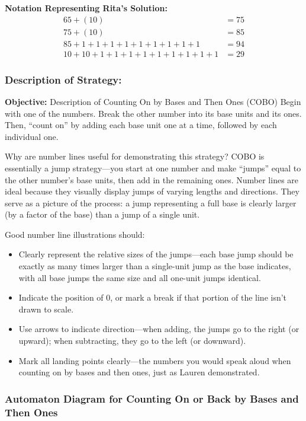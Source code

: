 \documentclass[11pt]{article}
\begin{document}
\noindent \textbf{Notation Representing Rita's Solution:}
\begin{align*}
    65 + (10) &= 75\\
    75 + (10) &= 85\\
    85 + 1 + 1 + 1 + 1 + 1 + 1 + 1 + 1 + 1 &= 94\\
    10 + 10 + 1 + 1 + 1 + 1 + 1 + 1 + 1 + 1 + 1 &= 29
    \end{align*}
    

\subsubsection*{Description of Strategy:}

 \textbf{Objective:} Description of Counting On by Bases and Then Ones (COBO)
 Begin with one of the numbers. Break the other number into its base units and its ones. Then, “count on” by adding each base unit one at a time, followed by each individual one.
 
 Why are number lines useful for demonstrating this strategy?
 COBO is essentially a jump strategy—you start at one number and make “jumps” equal to the other number’s base units, then add in the remaining ones. Number lines are ideal because they visually display jumps of varying lengths and directions. They serve as a picture of the process: a jump representing a full base is clearly larger (by a factor of the base) than a jump of a single unit.
 
 Good number line illustrations should:
\begin{itemize}
 \item Clearly represent the relative sizes of the jumps—each base jump should be exactly as many times larger than a single-unit jump as the base indicates, with all base jumps the same size and all one-unit jumps identical.
 \item Indicate the position of 0, or mark a break if that portion of the line isn’t drawn to scale.
 \item Use arrows to indicate direction—when adding, the jumps go to the right (or upward); when subtracting, they go to the left (or downward).
 \item Mark all landing points clearly—the numbers you would speak aloud when counting on by bases and then ones, just as Lauren demonstrated.
\end{itemize}

\subsubsection*{Automaton Diagram for Counting On or Back by Bases and Then Ones}
\end{document}

